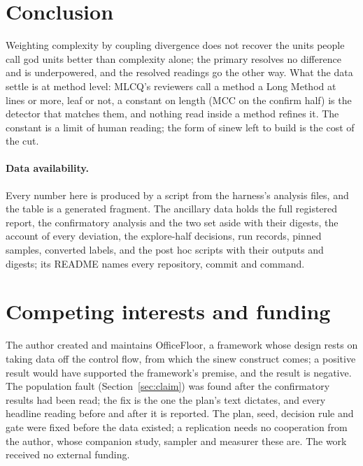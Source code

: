\documentclass[11pt,a4paper]{article}
\begin{document}
\section{Conclusion}

Weighting complexity by coupling divergence does not recover the units
people call god units better than complexity alone; the primary resolves
no difference and is underpowered, and the resolved readings go the other
way. What the data settle is at method level: MLCQ's reviewers call a
method a Long Method at \lwLengthCutoff{} lines or more, leaf or not, a
constant on length (MCC \lwLengthMccConfirm{} on the confirm half) is the
detector that matches them, and nothing read inside a method refines it.
The constant is a limit of human reading; the form of sinew left to build
is the cost of the cut.

\paragraph{Data availability.} Every number here is produced by a script
from the harness's analysis files, and the table is a generated fragment.
The ancillary data holds the full registered report, the confirmatory
analysis and the two set aside with their digests, the account of every
deviation, the explore-half decisions, run records, pinned samples,
converted labels, and the post hoc scripts with their outputs and digests;
its README names every repository, commit and command.

\section*{Competing interests and funding}

The author created and maintains OfficeFloor, a framework whose design
rests on taking data off the control flow, from which the sinew construct
comes; a positive result would have supported the framework's premise, and
the result is negative. The population fault (Section~\ref{sec:claim}) was found after the
confirmatory results had been read; the fix is the one the plan's text
dictates, and every headline reading before and after it is reported. The
plan, seed, decision rule and gate were fixed before the data existed; a
replication needs no cooperation from the author, whose companion study,
sampler and measurer these are. The work received no external funding.
\end{document}

